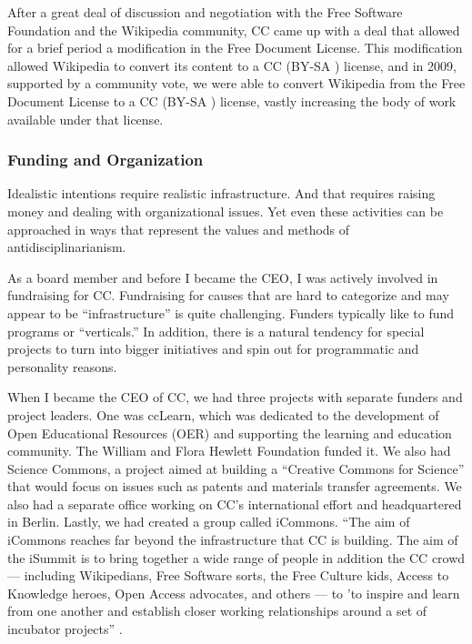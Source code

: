 After a great deal of discussion and negotiation with the Free Software Foundation and the Wikipedia community, \ac{CC} came up with a deal that allowed for a brief period a modification in the Free Document License. This modification allowed Wikipedia to convert its content to a \ac{CC} (BY-SA \ccbysa) license, and in 2009, supported by a community vote, we were able to convert Wikipedia from the Free Document License to a \ac{CC} (BY-SA \ccbysa) license, vastly increasing the body of work available under that license.

\subsubsection{Funding and Organization}

Idealistic intentions require realistic infrastructure. And that requires raising money and dealing with organizational issues. Yet even these activities can be approached in ways that represent the values and methods of antidisciplinarianism.

As a board member and before I became the CEO, I was actively involved in fundraising for \ac{CC}. Fundraising for causes that are hard to categorize and may appear to be ``infrastructure'' is quite challenging. Funders typically like to fund programs or ``verticals.'' In addition, there is a natural tendency for special projects to turn into bigger initiatives and spin out for programmatic and personality reasons.

When I became the CEO of \ac{CC}, we had three projects with separate funders and project leaders. One was ccLearn, which was dedicated to the development of Open Educational Resources (OER) and supporting the learning and education community. The William and Flora Hewlett Foundation funded it. We also had Science Commons, a project aimed at building a ``Creative Commons for Science'' that would focus on issues such as patents and materials transfer agreements. We also had a separate office working on \ac{CC}'s international effort and headquartered in Berlin. Lastly, we had created a group called iCommons. ``The aim of iCommons reaches far beyond the infrastructure that \ac{CC} is building. The aim of the iSummit is to bring together a wide range of people in addition the \ac{CC} crowd --- including Wikipedians, Free Software sorts, the Free Culture kids, Access to Knowledge heroes, Open Access advocates, and others --- to 'to inspire and learn from one another and establish closer working relationships around a set of incubator projects'' \cite{iCommons18:online}.

